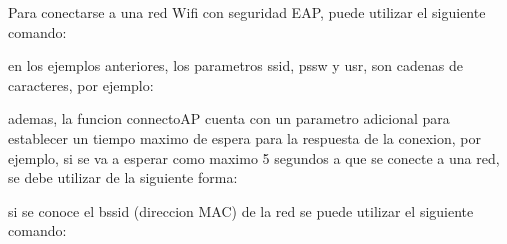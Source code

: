 \documentclass[letterpaper,10pt,english]{sphinxhowto}
\begin{document}
Para conectarse a una red Wifi con seguridad EAP, puede utilizar el siguiente comando:

\begin{sphinxVerbatim}[commandchars=\\\{\}]
  
\end{sphinxVerbatim}

en los ejemplos anteriores, los parametros ssid, pssw y usr, son cadenas de caracteres,
por ejemplo:

\begin{sphinxVerbatim}[commandchars=\\\{\}]
  
\end{sphinxVerbatim}

ademas, la funcion connectoAP cuenta con un parametro adicional para establecer
un tiempo maximo de espera para la respuesta de la conexion, por ejemplo, si se
va a esperar como maximo 5 segundos a que se conecte a una red, se debe utilizar
de la siguiente forma:

\begin{sphinxVerbatim}[commandchars=\\\{\}]
  
\end{sphinxVerbatim}

si se conoce el bssid (direccion MAC) de la red se puede utilizar el siguiente
comando:

\begin{sphinxVerbatim}[commandchars=\\\{\}]
 
\end{sphinxVerbatim}
\end{document}
